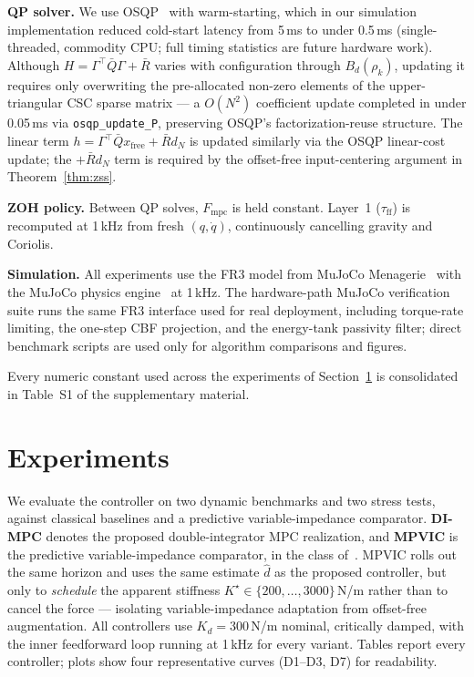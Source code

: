 \documentclass[journal]{IEEEtran}
\newcommand{\Fmpc}{F_{\text{mpc}}}
\begin{document}
\textbf{QP solver.}
We use OSQP~\cite{stellato2020osqp} with warm-starting, which in our
simulation implementation reduced cold-start latency from 5\,ms to under
0.5\,ms (single-threaded, commodity CPU; full timing statistics are future
hardware work).
Although $H=\Gamma^\top\bar{Q}\Gamma+\bar{R}$ varies with configuration
through $B_d(\rho_k)$, updating it requires only overwriting the
pre-allocated non-zero elements of the upper-triangular CSC sparse
matrix — a $O(N^2)$ coefficient update completed in under 0.05\,ms via
\texttt{osqp\_update\_P}, preserving OSQP's factorization-reuse
structure. The linear term
$h=\Gamma^\top\bar{Q}x_{\text{free}}+\bar R d_N$ is updated similarly
via the OSQP linear-cost update; the $+\bar R d_N$ term is required by
the offset-free input-centering argument in Theorem~\ref{thm:zss}.

\textbf{ZOH policy.}
Between QP solves, $\Fmpc$ is held constant.
Layer~1 ($\tau_{\text{ff}}$) is recomputed at 1\,kHz from fresh
$(q,\dot{q})$, continuously cancelling gravity and Coriolis.

\textbf{Simulation.}
All experiments use the FR3 model from MuJoCo
Menagerie~\cite{mujoco_menagerie} with the MuJoCo physics
engine~\cite{todorov2012mujoco} at 1\,kHz. The hardware-path MuJoCo
verification suite runs the same FR3 interface used for real deployment,
including torque-rate limiting, the one-step CBF projection, and the
energy-tank passivity filter; direct benchmark scripts are used only for
algorithm comparisons and figures.

Every numeric constant used across the experiments of
Section~\ref{sec:experiments} is consolidated in Table~S1 of the
supplementary material.

\section{Experiments}\label{sec:experiments}

We evaluate the controller on two dynamic benchmarks and two stress
tests, against classical baselines and a predictive variable-impedance
comparator. \textbf{DI-MPC} denotes the proposed double-integrator MPC
realization, and \textbf{MPVIC} is the predictive variable-impedance
comparator, in the class of~\cite{liu2025model,roveda2019optimal}. MPVIC
rolls out the same horizon and uses the same estimate $\hat d$ as the
proposed controller, but only to \emph{schedule} the apparent stiffness
$K^\star\in\{200,\dots,3000\}$\,N/m rather than to cancel the force ---
isolating variable-impedance adaptation from offset-free augmentation.
All controllers use $K_d=300$\,N/m nominal, critically damped, with the
inner feedforward loop running at 1\,kHz for every variant. Tables
report every controller; plots show four representative curves
(D1--D3, D7) for readability.
\end{document}

